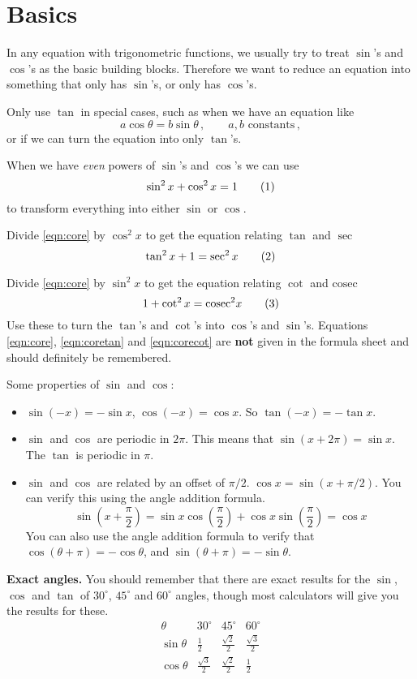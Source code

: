 \documentclass{article}
\date{x/x/20xx}
\newcommand\addtag{\refstepcounter{equation}\tag{\theequation}}
\begin{document}
\pagestyle{fancy}


\section{Basics}

In any equation with trigonometric functions, we usually try to treat $\sin$'s and $\cos$'s as the basic building blocks. Therefore we want to reduce an equation into something that only has $\sin$'s, or only has $\cos$'s.

Only use $\tan$ in special cases, such as when we have an equation like
\[
a\cos\theta=b\sin\theta\,,\qquad a,b\text{ constants}\,,
\]
or if we can turn the equation into only $\tan$'s.

When we have \emph{even} powers of $\sin$'s and $\cos$'s we can use
\[
\label{eqn:core}
\sin^2 x + \cos^2 x = 1 \addtag
\]
to transform everything into either $\sin$ or $\cos$. 

Divide \eqref{eqn:core} by $\cos^2x$ to get the equation relating $\tan$ and $\sec$
\[
\label{eqn:coretan}
\tan^2x+1 = \sec^2x \addtag
\]

Divide \eqref{eqn:core} by $\sin^2x$ to get the equation relating $\cot$ and $\mathrm{cosec}$
\[
\label{eqn:corecot}
1 + \cot^2x=\mathrm{cosec}^2x \addtag
\]
Use these to turn the $\tan$'s and $\cot$'s into $\cos$'s and $\sin$'s. Equations \eqref{eqn:core}, \eqref{eqn:coretan} and \eqref{eqn:corecot} are \textbf{not} given in the formula sheet and should definitely be remembered.

Some properties of $\sin$ and $\cos$:
\begin{itemize}
    \item $\sin(-x)=-\sin x$, $\cos(-x)=\cos x$. So $\tan(-x)=-\tan x$.
    \item $\sin$ and $\cos$ are periodic in $2\pi$. This means that $\sin(x+2\pi)=\sin x$. The $\tan$ is periodic in $\pi$.
    \item $\sin$ and $\cos$ are related by an offset of $\pi/2$. $\cos x = \sin(x+\pi/2)$. You can verify this using the angle addition formula.
    \[
    \sin\left(x+\frac{\pi}{2}\right) = \sin x\cos\left(\frac{\pi}{2}\right) + \cos x\sin\left(\frac{\pi}{2}\right) = \cos x
    \]
    You can also use the angle addition formula to verify that $\cos(\theta+\pi) = -\cos\theta$, and $\sin(\theta+\pi) = -\sin\theta$.
\end{itemize}

\textbf{Exact angles.} You should remember that there are exact results for the $\sin$, $\cos$ and $\tan$ of $30^\circ$, $45^\circ$ and $60^\circ$ angles, though most calculators will give you the results for these.
\[
\begin{array}{c|c|c|c}
    \theta & 30^\circ & 45^\circ & 60^\circ\\
    \hline
    \sin\theta & \frac{1}{2} & \frac{\sqrt{2}}{2} & \frac{\sqrt{3}}{2}\\
    \cos\theta & \frac{\sqrt{3}}{2} & \frac{\sqrt{2}}{2} & \frac{1}{2}
\end{array}
\]
\end{document}
